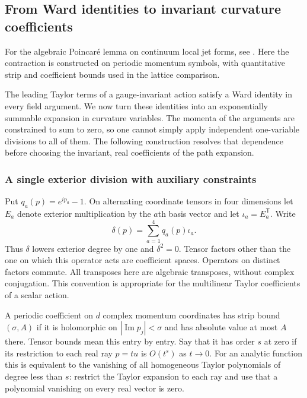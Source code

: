 \subsection{From Ward identities to invariant curvature coefficients}
\label{sec:multileg-curvature-lift}

For the algebraic Poincar\'e lemma on continuum local jet forms, see
\cite[Theorem~4.2]{BarnichBrandtHenneaux}. Here the contraction is
constructed on periodic momentum symbols, with quantitative strip
and coefficient bounds used in the lattice comparison.

The leading Taylor terms of a gauge-invariant action satisfy a
Ward identity in every field argument. We now turn these identities
into an exponentially summable expansion in curvature variables.
The momenta of the arguments are constrained to sum to zero, so
one cannot simply apply independent one-variable divisions to all
of them. The following construction resolves that dependence before
choosing the invariant, real coefficients of the path expansion.

\subsubsection{A single exterior division with auxiliary constraints}
Put $q_a(p)=e^{ip_a}-1$. On alternating coordinate tensors in four
dimensions let $E_a$ denote exterior multiplication by the $a$th
basis vector and let $\iota_a=E_a^{\mathsf T}$. Write
\[
 \delta(p)=\sum_{a=1}^4 q_a(p)\iota_a.
\]
Thus $\delta$ lowers exterior degree by one and $\delta^2=0$.
Tensor factors other than the one on which this operator acts
are coefficient spaces. Operators on distinct factors commute.
All transposes here are algebraic transposes, without complex
conjugation. This convention is appropriate for the multilinear
Taylor coefficients of a scalar action.

A periodic coefficient on $d$ complex momentum coordinates has
strip bound $(\sigma,A)$ if it is holomorphic on
$|\operatorname{Im}p_j|<\sigma$ and has absolute value at most $A$
there. Tensor bounds mean this entry by entry. Say that it has
order $s$ at zero if its restriction to each real ray $p=tu$ is
$O(t^s)$ as $t\to0$. For an analytic function this is equivalent
to the vanishing of all homogeneous Taylor polynomials of degree
less than $s$: restrict the Taylor expansion to each ray and use
that a polynomial vanishing on every real vector is zero.

